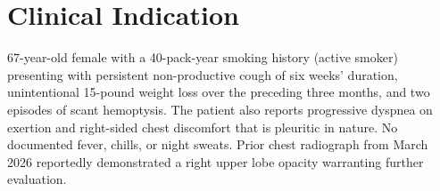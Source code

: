 \section{Clinical Indication}

67-year-old female with a 40-pack-year smoking history (active smoker) presenting with persistent non-productive cough of six weeks' duration, unintentional 15-pound weight loss over the preceding three months, and two episodes of scant hemoptysis. The patient also reports progressive dyspnea on exertion and right-sided chest discomfort that is pleuritic in nature. No documented fever, chills, or night sweats. Prior chest radiograph from March 2026 reportedly demonstrated a right upper lobe opacity warranting further evaluation.

